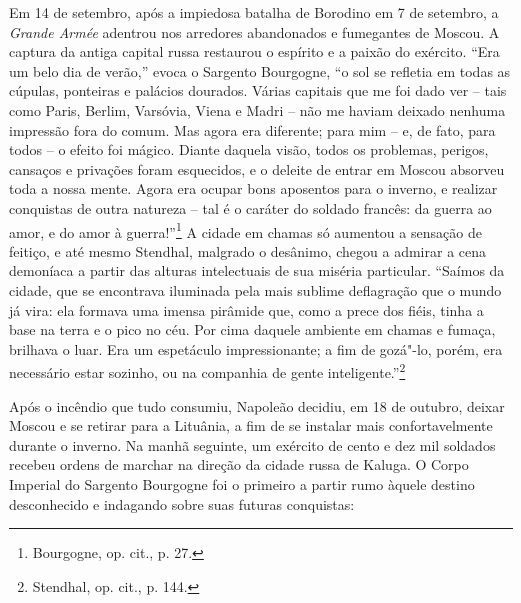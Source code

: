 \asterisc

Em 14 de setembro, após a impiedosa batalha de Borodino em 7 de
setembro, a \textit{Grande Armée} adentrou nos arredores abandonados e
fumegantes de Moscou. A captura da antiga capital russa restaurou o
espírito e a paixão do exército. ``Era um belo dia de verão,'' evoca o
Sargento Bourgogne, ``o sol se refletia em todas as cúpulas, ponteiras e
palácios dourados. Várias capitais que me foi dado ver -- tais como
Paris, Berlim, Varsóvia, Viena e Madri -- não me haviam deixado nenhuma
impressão fora do comum. Mas agora era diferente; para mim -- e, de fato,
para todos -- o efeito foi mágico. Diante daquela visão, todos os
problemas, perigos, cansaços e privações foram esquecidos, e o deleite
de entrar em Moscou absorveu toda a nossa mente. Agora era ocupar bons
aposentos para o inverno, e realizar conquistas de outra natureza -- tal
é o caráter do soldado francês: da guerra ao amor, e do amor à
guerra!''\footnote{Bourgogne, op. cit., p. 27.} A cidade em chamas só
aumentou a sensação de feitiço, e até mesmo Stendhal, malgrado o
desânimo, chegou a admirar a cena demoníaca a partir das alturas
intelectuais de sua miséria particular. ``Saímos da cidade, que se
encontrava iluminada pela mais sublime deflagração que o mundo já vira:
ela formava uma imensa pirâmide que, como a prece dos fiéis, tinha a
base na terra e o pico no céu. Por cima daquele ambiente em chamas e
fumaça, brilhava o luar. Era um espetáculo impressionante; a fim de
gozá"-lo, porém, era necessário estar sozinho, ou na companhia de gente
inteligente.''\footnote{Stendhal, op. cit., p. 144.}

Após o incêndio que tudo consumiu, Napoleão decidiu, em 18 de outubro,
deixar Moscou e se retirar para a Lituânia, a fim de se instalar mais
confortavelmente durante o inverno. Na manhã seguinte, um exército de
cento e dez mil soldados recebeu ordens de marchar na direção da cidade
russa de Kaluga. O Corpo Imperial do Sargento Bourgogne foi o primeiro a
partir rumo àquele destino desconhecido e indagando sobre suas futuras
conquistas:


